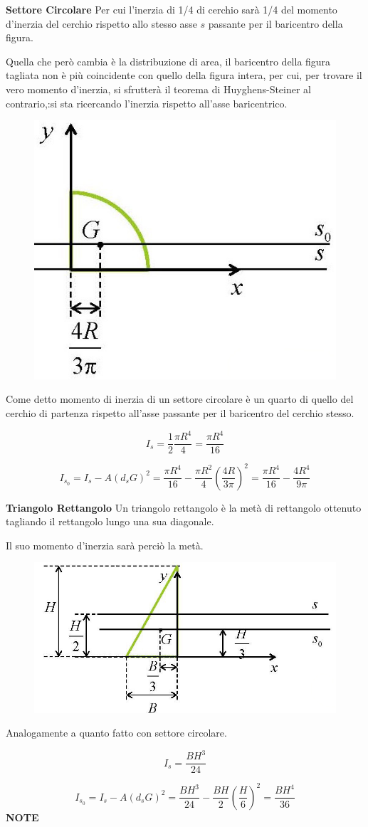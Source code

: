 \documentclass{article}
\begin{document}
\begin{adjustwidth}{2in}{}
{\Large \textbf{Settore Circolare}} \mbox{} \newline
	Per cui l'inerzia di 1/4 di cerchio sarà 1/4 del momento d'inerzia del cerchio rispetto allo stesso asse $s$ passante per il baricentro della figura. 

	Quella che però cambia è la distribuzione di area, il baricentro della figura tagliata non è più coincidente con quello della figura intera, per cui, per trovare il vero momento d'inerzia, si sfrutterà il teorema di Huyghens-Steiner al contrario,:si sta ricercando l'inerzia rispetto all'asse baricentrico. 
\begin{figure}[H]
	\centering
	\includegraphics[width=0.25\linewidth]{immagini/1.PARTE7_Pagina_78 (2)}
\end{figure}
	
	Come detto momento di inerzia di un settore circolare è un quarto di quello del cerchio di partenza rispetto all’asse passante per il
	baricentro del cerchio stesso.
	
	\[ I_{s} = \dfrac{1}{2}\dfrac{\pi R^4}{4} = \dfrac{\pi R^4}{16}\]
	
	\[ I_{s_0} = I_{s} - A(d_sG)^2 = \dfrac{\pi R^4}{16} - \dfrac{\pi R^2}{4} \left( \dfrac{4R}{3\pi}\right)^2 = \dfrac{\pi R^4}{16}  - \dfrac{4R^4}{9\pi} \]
	
{\Large \textbf{Triangolo Rettangolo}} \mbox{} \newline
	Un triangolo rettangolo è la metà di rettangolo ottenuto tagliando il rettangolo lungo una sua diagonale. \newline 
	
	Il suo momento d'inerzia sarà perciò la metà.
\begin{figure}[H]
	\centering
	\includegraphics[width=0.25\linewidth]{immagini/1.PARTE7_Pagina_78}
\end{figure}
	Analogamente a quanto fatto con settore circolare.
	
	\[ I_{s} = \dfrac{BH^3}{24}\]
	
	\[ I_{s_0} = I_{s} - A(d_sG)^2 = \dfrac{BH^3}{24} - \dfrac{BH}{2} \left( \dfrac{H}{6} \right)^2 = \dfrac{BH^4}{36} \]
	\newpage
{\Large \textbf{NOTE}} \mbox{} \newline	



\end{adjustwidth}
\end{document}
